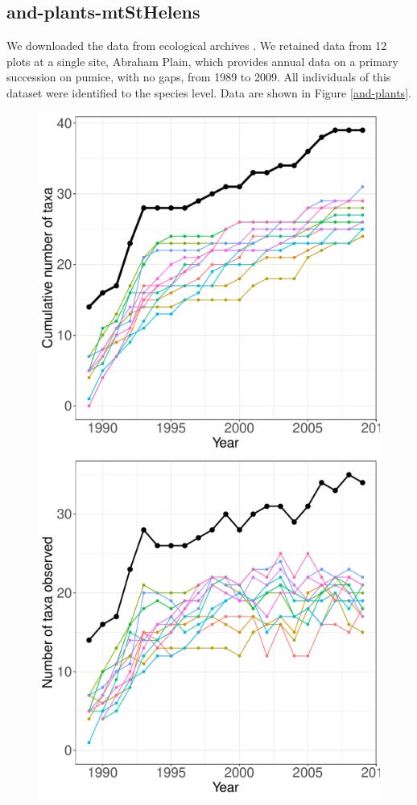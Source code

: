 \documentclass[11pt, oneside]{article}
\begin{document}
\subsection {and-plants-mtStHelens}
We downloaded the data from ecological archives \citep{del_moral_thirty_2010}. We retained data from 12 plots at a single site, Abraham Plain, which provides annual data on a primary succession on pumice, with no gaps, from 1989 to 2009. All individuals of this dataset were identified to the species level. Data are shown in Figure \ref{and-plants}.
\begin{figure}[h!]
\centering
\includegraphics[scale = 0.4]{and-plants-mtStHelens_species_accumulation_curve.pdf}
\includegraphics[scale = 0.4]{and-plants-mtStHelens_num_taxa_over_time.pdf}

\end{figure}
\end{document}
